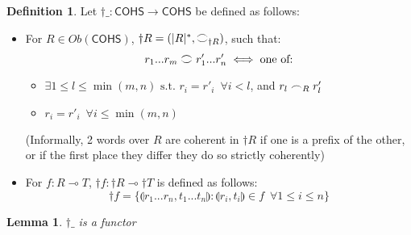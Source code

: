 \documentclass[12pt, oneside]{article}
\theoremstyle{plain}
\newtheorem{lemma}[theorem]{Lemma}
\theoremstyle{definition}
\newtheorem{definition}[theorem]{Definition}
\let\originaldagger\dagger
\renewcommand{\dag}{\mathord{\originaldagger}}
\newcommand{\lp}{\llparenthesis}
\newcommand{\rp}{\rrparenthesis}
\newcommand{\cohs}{{\mathsf{COHS}}}
\newcommand{\coh}[1][]{\mathrel{\vcenter{\offinterlineskip\hbox{$\frown$}\vskip0.2ex\hbox{$\smile$}}_{\ifx\\#1\\\else#1\fi}}}
\newcommand{\scoh}[1][]{\mathrel{\frown}_{\ifx\\#1\\\else#1\fi}}
\begin{document}
\begin{definition}
    Let $\dag\_:\cohs\to\cohs$ be defined as follows:

    \begin{itemize}
        \item
        For $R\in Ob(\cohs)$, $\dag R=(|R|^*,\coh[\dag R])$, such that:
        $$r_1...r_m \coh r'_1...r'_n \iff \text{one of:}$$

        \begin{itemize}
            \item
            $\exists 1\leq l \leq \min(m,n) \text{ s.t. } r_i=r'_i \enspace\forall i<l$, and $r_l \scoh[R] r'_l$

            \item
            $r_i = r'_i \enspace\forall i\le\min(m,n)$
        \end{itemize}

        (Informally, 2 words over $R$ are coherent in $\dag R$ if one is a prefix of the other, or if the first place they differ they do so strictly coherently)

        \item
        For $f:R\multimap T$, $\dag f:\dag R\multimap\dag T$ is defined as follows:
        $$\dag f=\{\lp r_1...r_n,t_1...t_n\rp:\lp r_i,t_i\rp\in f\enspace\forall 1\le i\le n\}$$
    \end{itemize}
\end{definition}

\begin{lemma}
    $\dag\_$ is a functor
\end{lemma}
\end{document}
